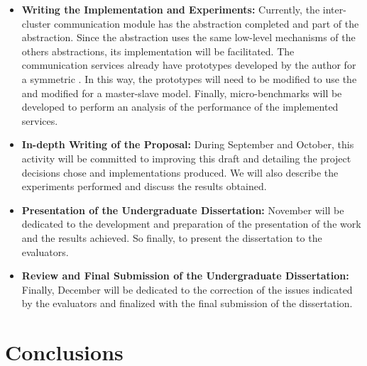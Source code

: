 	\begin{itemize}
		\item \textbf{Writing the Implementation and Experiments:}
			Currently, the inter-cluster communication module has the \sync abstraction
			completed and part of the \mailbox abstraction.
			Since the \portal abstraction uses the same low-level mechanisms of the others
			abstractions, its implementation will be facilitated.
			The communication services already have prototypes developed by the author
			for a symmetric \os.
			In this way, the prototypes will need to be modified to use the \hal and
			modified for a master-slave model.
			Finally, micro-benchmarks will be developed to perform an analysis of the
			performance of the implemented services.
		\item \textbf{In-depth Writing of the Proposal:}
			During September and October, this activity will be committed to improving
			this draft and detailing the project decisions chose and implementations produced.
			We will also describe the experiments performed and discuss the results obtained.
		\item \textbf{Presentation of the Undergraduate Dissertation:}
			November will be dedicated to the development and preparation of the presentation
			of the work and the results achieved.
			So finally, to present the dissertation to the evaluators.
		\item \textbf{Review and Final Submission of the Undergraduate Dissertation:}
			Finally, December will be dedicated to the correction of the issues indicated
			by the evaluators and finalized with the final submission of the dissertation.
	\end{itemize}

 \chapter{Conclusions}
\label{ch.conclusions}

